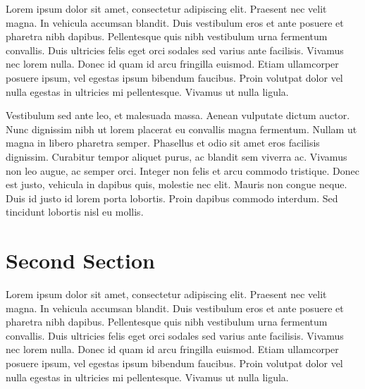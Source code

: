Lorem ipsum dolor sit amet, consectetur adipiscing elit. Praesent nec velit magna. In vehicula accumsan blandit. Duis vestibulum eros et ante posuere et pharetra nibh dapibus. Pellentesque quis nibh vestibulum urna fermentum convallis. Duis ultricies felis eget orci sodales sed varius ante facilisis. Vivamus nec lorem nulla. Donec id quam id arcu fringilla euismod. Etiam ullamcorper posuere ipsum, vel egestas ipsum bibendum faucibus. Proin volutpat dolor vel nulla egestas in ultricies mi pellentesque. Vivamus ut nulla ligula.

Vestibulum sed ante leo, et malesuada massa. Aenean vulputate dictum auctor. Nunc dignissim nibh ut lorem placerat eu convallis magna fermentum. Nullam ut magna in libero pharetra semper. Phasellus et odio sit amet eros facilisis dignissim. Curabitur tempor aliquet purus, ac blandit sem viverra ac. Vivamus non leo augue, ac semper orci. Integer non felis et arcu commodo tristique. Donec est justo, vehicula in dapibus quis, molestie nec elit. Mauris non congue neque. Duis id justo id lorem porta lobortis. Proin dapibus commodo interdum. Sed tincidunt lobortis nisl eu mollis.


\section{Second Section}
\label{sec:fakesection}
Lorem ipsum dolor sit amet, consectetur adipiscing elit. Praesent nec velit magna. In vehicula accumsan blandit. Duis vestibulum eros et ante posuere et pharetra nibh dapibus. Pellentesque quis nibh vestibulum urna fermentum convallis. Duis ultricies felis eget orci sodales sed varius ante facilisis. Vivamus nec lorem nulla. Donec id quam id arcu fringilla euismod. Etiam ullamcorper posuere ipsum, vel egestas ipsum bibendum faucibus. Proin volutpat dolor vel nulla egestas in ultricies mi pellentesque. Vivamus ut nulla ligula.


